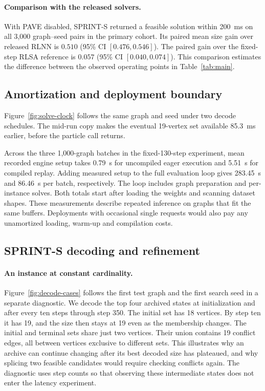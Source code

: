 \paragraph{Comparison with the released solvers.}
With PAVE disabled, SPRINT-S returned a feasible solution within 200~ms on all 3,000 graph--seed pairs in the primary cohort. Its paired mean size gain over released RLNN is \(0.510\) (95\% CI \([0.476,0.546]\)). The paired gain over the fixed-step RLSA reference is \(0.057\) (95\% CI \([0.040,0.074]\)). This comparison estimates the difference between the observed operating points in Table~\ref{tab:main}.


\subsection{Amortization and deployment boundary}

Figure~\ref{fig:solve-clock} follows the same graph and seed under two decode schedules. The mid-run copy makes the eventual 19-vertex set available 85.3~ms earlier, before the particle call returns.

Across the three 1,000-graph batches in the fixed-130-step experiment, mean recorded engine setup takes 0.79~s for uncompiled eager execution and 5.51~s for compiled replay. Adding measured setup to the full evaluation loop gives 283.45~s and 86.46~s per batch, respectively. The loop includes graph preparation and per-instance solves. Both totals start after loading the weights and scanning dataset shapes. These measurements describe repeated inference on graphs that fit the same buffers. Deployments with occasional single requests would also pay any unamortized loading, warm-up and compilation costs.


\subsection{SPRINT-S decoding and refinement}
\label{app:decode}

\paragraph{An instance at constant cardinality.}
Figure~\ref{fig:decode-cases} follows the first test graph and the first search seed in a separate diagnostic. We decode the top four archived states at initialization and after every ten steps through step 350. The initial set has 18 vertices. By step ten it has 19, and the size then stays at 19 even as the membership changes. The initial and terminal sets share just two vertices. Their union contains 19 conflict edges, all between vertices exclusive to different sets. This illustrates why an archive can continue changing after its best decoded size has plateaued, and why splicing two feasible candidates would require checking conflicts again. The diagnostic uses step counts so that observing these intermediate states does not enter the latency experiment.

